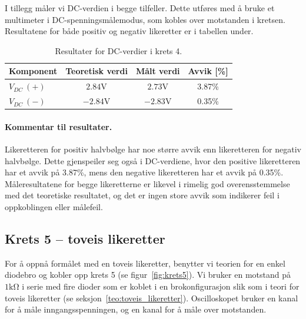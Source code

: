 \noindent
I tillegg måler vi DC-verdien i begge tilfeller. Dette utføres med å bruke et multimeter i DC-spenningsmålemodus, som kobles over motstanden i kretsen. Resultatene for både positiv og negativ likeretter er i tabellen under.

\begin{table}[H]
\centering
\caption{Resultater for DC-verdier i krets 4.}
\label{tab:krets4_dc_verdier}
\begin{tabular}{lccc}
\toprule
\textbf{Komponent} & \textbf{Teoretisk verdi} & \textbf{Målt verdi} & \textbf{Avvik [\%]} \\
\midrule

$V_{DC} \: \left(+\right)$ & $2.84\text{V}$ & $2.73\text{V}$ & 3.87\% \\
$V_{DC} \: \left(-\right)$ & $-2.84\text{V}$ & $-2.83\text{V}$ & 0.35\% \\



\bottomrule
\end{tabular}
\end{table}

\paragraph{Kommentar til resultater. } Likeretteren for positiv halvbølge har noe større avvik enn likeretteren for negativ halvbølge. Dette gjenspeiler seg også i DC-verdiene, hvor den positive likeretteren har et avvik på 3.87\%, mens den negative likeretteren har et avvik på 0.35\%. Måleresultatene for begge likeretterne er likevel i rimelig god overensstemmelse med det teoretiske resultatet, og det er ingen store avvik som indikerer feil i oppkoblingen eller målefeil.


\subsection{Krets 5 -- toveis likeretter}

For å oppnå formålet med en toveis likeretter, benytter vi teorien for en enkel diodebro og kobler opp krets 5 (se figur~\ref{fig:krets5}). Vi bruker en motstand på $1\mathrm{k\Omega}$ i serie med fire dioder som er koblet i en brokonfigurasjon slik som i teori for toveis likeretter (se seksjon~\ref{teo:toveis_likeretter}). Oscilloskopet bruker en kanal for å måle inngangsspenningen, og en kanal for å måle over motstanden.

